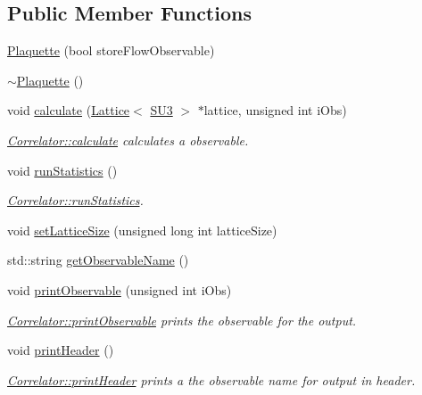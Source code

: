 \subsection*{Public Member Functions}
\begin{DoxyCompactItemize}
\item 
\mbox{\hyperlink{class_plaquette_a1c87b43fc7ee74b2b0289de63e03bb61}{Plaquette}} (bool store\+Flow\+Observable)
\item 
\mbox{\hyperlink{class_plaquette_a8730cb08bee0e0f9260bf8f11f52b8c0}{$\sim$\+Plaquette}} ()
\item 
void \mbox{\hyperlink{class_plaquette_a40cae6fd587c14836bdf61e69c615a00}{calculate}} (\mbox{\hyperlink{class_lattice}{Lattice}}$<$ \mbox{\hyperlink{class_s_u3}{S\+U3}} $>$ $\ast$lattice, unsigned int i\+Obs)
\begin{DoxyCompactList}\small\item\em \mbox{\hyperlink{class_correlator_ab33502ff305f891c5c2e6d66a26a0247}{Correlator\+::calculate}} calculates a observable. \end{DoxyCompactList}\item 
void \mbox{\hyperlink{class_plaquette_aa54bf1807d9b192048026f94d585fa4f}{run\+Statistics}} ()
\begin{DoxyCompactList}\small\item\em \mbox{\hyperlink{class_correlator_a35197b1d12b62ef30b79c0138a26456e}{Correlator\+::run\+Statistics}}. \end{DoxyCompactList}\item 
void \mbox{\hyperlink{class_plaquette_a011e1ca450fb40273ec8efa6d094c279}{set\+Lattice\+Size}} (unsigned long int lattice\+Size)
\item 
std\+::string \mbox{\hyperlink{class_plaquette_a86de9d267ae1bc6a8c6d3335837ea683}{get\+Observable\+Name}} ()
\item 
void \mbox{\hyperlink{class_plaquette_aa15bf42749c9fd995d4d572ca3ed4f22}{print\+Observable}} (unsigned int i\+Obs)
\begin{DoxyCompactList}\small\item\em \mbox{\hyperlink{class_correlator_a15744ddb9f2b71fff34ac762d101df38}{Correlator\+::print\+Observable}} prints the observable for the output. \end{DoxyCompactList}\item 
void \mbox{\hyperlink{class_plaquette_aef85b75fe7ce4780eeacf96c5da1b4b4}{print\+Header}} ()
\begin{DoxyCompactList}\small\item\em \mbox{\hyperlink{class_correlator_ac7c5a07d7cbee97c417a1659b93083b2}{Correlator\+::print\+Header}} prints a the observable name for output in header. \end{DoxyCompactList}\end{DoxyCompactItemize}
